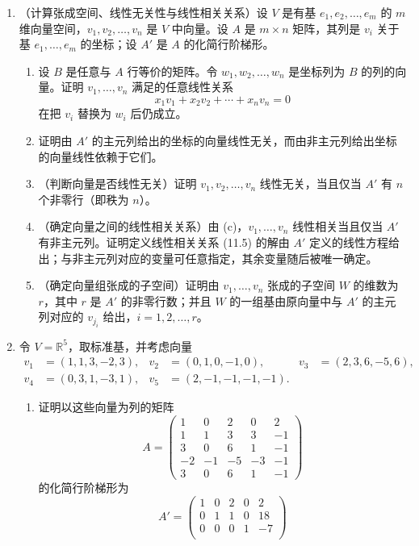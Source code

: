 \begin{enumerate}[label=\arabic*.,resume]
\[\]
\item （计算张成空间、线性无关性与线性相关关系）设 $V$ 是有基 $e_1,e_2,\ldots,e_m$ 的 $m$ 维向量空间，$v_1,v_2,\ldots,v_n$ 是 $V$ 中向量。设 $A$ 是 $m\times n$ 矩阵，其列是 $v_i$ 关于基 $e_1,\ldots,e_m$ 的坐标；设 $A'$ 是 $A$ 的化简行阶梯形。
\begin{enumerate}[label=(\alph*)]
\item 设 $B$ 是任意与 $A$ 行等价的矩阵。令 $w_1,w_2,\ldots,w_n$ 是坐标列为 $B$ 的列的向量。证明 $v_1,\ldots,v_n$ 满足的任意线性关系
\begin{equation}
x_1v_1+x_2v_2+\cdots+x_nv_n=0
\tag{11.5}
\end{equation}
在把 $v_i$ 替换为 $w_i$ 后仍成立。
\item 证明由 $A'$ 的主元列给出的坐标的向量线性无关，而由非主元列给出坐标的向量线性依赖于它们。
\item （判断向量是否线性无关）证明 $v_1,v_2,\ldots,v_n$ 线性无关，当且仅当 $A'$ 有 $n$ 个非零行（即秩为 $n$）。
\item （确定向量之间的线性相关关系）由 (c)，$v_1,\ldots,v_n$ 线性相关当且仅当 $A'$ 有非主元列。证明定义线性相关关系 (11.5) 的解由 $A'$ 定义的线性方程给出；与非主元列对应的变量可任意指定，其余变量随后被唯一确定。
\item （确定向量组张成的子空间）证明由 $v_1,\ldots,v_n$ 张成的子空间 $W$ 的维数为 $r$，其中 $r$ 是 $A'$ 的非零行数；并且 $W$ 的一组基由原向量中与 $A'$ 的主元列对应的 $v_{j_i}$ 给出，$i=1,2,\ldots,r$。
\end{enumerate}
\item 令 $V=\mathbb R^5$，取标准基，并考虑向量
\[
\begin{aligned}
v_1&=(1,1,3,-2,3),&
 v_2&=(0,1,0,-1,0),&
 v_3&=(2,3,6,-5,6),\\
v_4&=(0,3,1,-3,1),&
 v_5&=(2,-1,-1,-1,-1).
\end{aligned}
\]
\begin{enumerate}[label=(\alph*)]
\item 证明以这些向量为列的矩阵
\[
A=\begin{pmatrix}
1&0&2&0&2\\
1&1&3&3&-1\\
3&0&6&1&-1\\
-2&-1&-5&-3&-1\\
3&0&6&1&-1
\end{pmatrix}
\]
的化简行阶梯形为
\[
A'=\begin{pmatrix}
1&0&2&0&2\\
0&1&1&0&18\\
0&0&0&1&-7\\

\end{pmatrix}\]
\end{enumerate}
\end{enumerate}
